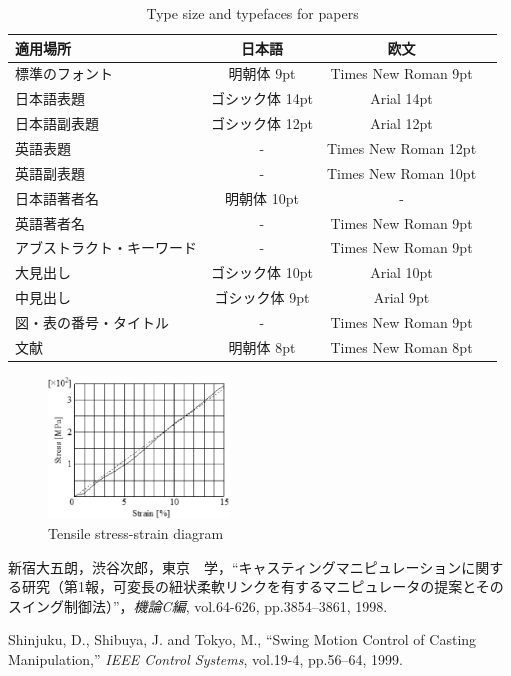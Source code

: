 \documentclass{jarticle}
\begin{document}



\begin{table}[h]
 \caption{Type size and typefaces for papers}
 \label{tbl: table1}
 \centering
 \footnotesize
 \begin{tabular}{|p{}|c|c|c|}
  \hline
	適用場所	&日本語	&欧文 \\\hline
	標準のフォント	&明朝体 9pt	&Times New Roman 9pt \\\hline
	日本語表題	&ゴシック体 14pt	&Arial 14pt \\\hline
	日本語副表題	&ゴシック体 12pt	&Arial 12pt \\\hline
	英語表題	&-&Times New Roman 12pt \\\hline
	英語副表題	&-&Times New Roman 10pt \\\hline
	日本語著者名	&明朝体 10pt &-\\\hline
	英語著者名	&-&Times New Roman 9pt \\\hline
	アブストラクト・キーワード	&-&Times New Roman 9pt \\\hline
	大見出し	&ゴシック体 10pt	&Arial 10pt \\\hline
	中見出し	&ゴシック体 9pt	&Arial 9pt \\\hline
	図・表の番号・タイトル	 &-&Times New Roman 9pt \\\hline
	文献	&明朝体 8pt	&Times New Roman 8pt \\
  \hline
 \end{tabular}
\end{table}

\begin{figure}[h]
 \centering
  \includegraphics[height=38mm]{fig1.eps}
  \vspace*{-4mm}
  \caption{Tensile stress-strain diagram}
  \label{fig: fig1}
\end{figure}


\footnotesize
\begin{thebibliography}{99}

新宿大五朗，渋谷次郎，東京　学，``キャスティングマニピュレーションに関する研究（第1報，可変長の紐状柔軟リンクを有するマニピュレータの提案とそのスイング制御法）''，{\it 機論C編}, vol.64-626, pp.3854--3861, 1998.

Shinjuku, D., Shibuya, J. and Tokyo, M., ``Swing Motion Control of Casting Manipulation,'' {\it IEEE Control Systems}, vol.19-4, pp.56--64, 1999.

\end{thebibliography}

\normalsize
\end{document}
